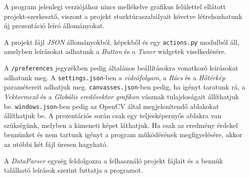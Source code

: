 

A program jelenlegi verziójához nincs mellékelve grafikus felülettel ellátott projekt-szerkesztő, viszont a projekt sturktúraszabályait követve létrehozhatunk új prezentáció leíró állományokat.

\bigskip


\bigskip

\noindent A projekt fájl \textit{JSON} állományokból, képekből és egy \texttt{actions.py} modulból áll, amelyben leírásokat adhatunk a \textit{Button} és a \textit{Tuner} widgetek viselkedésére.

A \texttt{/preferences} jegyzékben pedig általános beállításokra vonatkozó leírásokat adhatunk meg. A \texttt{settings.json}-ben a \textit{videófolyam}, a \textit{Rács} és a \textit{Hőtérkép} paramétereit adhatjuk meg.
\texttt{canvasses.json}-ben pedig, ha igényt taratunk rá, a \textit{Vektormező} és a \textit{Globális eredővektor grafikon} vásznak tulajdoságait állíthatjuk be.
\texttt{windows.json}-ben pedig az OpenCV által megjelenítendő ablakokat állíthatjuk be. A prezentációs során csak egy teljesképernyős ablakra van szükségünk, melyben a kimeneti képet láthatjuk. Ha csak az eredmény érdekel bennünket és nem tartunk igényt a program működésének megfigyelésére, akkor az utóbbi két fájl üresen hagyható.

A \textit{DataParser} egység feldolgozza a felhasználó projekt fájlait és a bennük található leírások szerint futtatja a programot.

